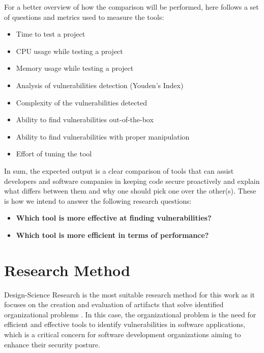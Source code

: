 For a better overview of how the comparison will be performed, here follows a set of questions and metrics used to measure the tools:
\begin{itemize}
    \item Time to test a project
    \item CPU usage while testing a project
    \item Memory usage while testing a project
    \item Analysis of vulnerabilities detection (Youden's Index)
    \item Complexity of the vulnerabilities detected
    \item Ability to find vulnerabilities out-of-the-box
    \item Ability to find vulnerabilities with proper manipulation
    \item Effort of tuning the tool
\end{itemize}

In sum, the expected output is a clear comparison of tools that can assist developers and software companies in keeping code secure proactively and explain what differs between them and why one should pick one over the other(s). These is how we intend to answer the following research questions:

\begin{itemize}
    \item \textbf{Which tool is more effective at finding vulnerabilities?}
    \item \textbf{Which tool is more efficient in terms of performance?}
\end{itemize}

\section{Research Method}\label{section:research_method}

Design-Science Research is the most suitable research method for this work as it focuses on the creation and evaluation of artifacts that solve identified organizational problems \citep{Hevner2004}. In this case, the organizational problem is the need for efficient and effective tools to identify vulnerabilities in software applications, which is a critical concern for software development organizations aiming to enhance their security posture.


